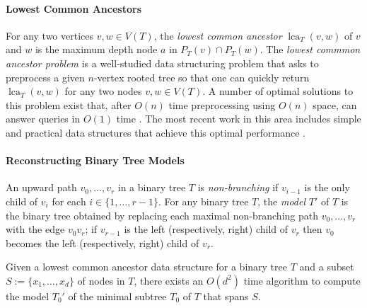 \documentclass{patmorin}
\DeclareMathOperator{\lca}{lca}
\begin{document}
\paragraph{Lowest Common Ancestors}

For any two vertices $v,w\in V(T)$, the \emph{lowest common ancestor} $\lca_T(v,w)$ of $v$ and $w$ is the maximum depth node $a$ in $P_T(v)\cap P_T(w)$.  The \emph{lowest commmon ancestor problem} is a well-studied data structuring problem that asks to preprocess a given $n$-vertex rooted tree so that one can quickly return $\lca_T(v,w)$ for any two nodes $v,w\in V(T)$. A number of optimal solutions to this problem exist that, after $O(n)$ time preprocessing using $O(n)$ space, can answer queries in $O(1)$ time \cite{berman.vishkin:recursive,shieber.vishkin:on,harel.tarjan:fast,alstrup.gavoille.ea:nearest,bender.farach-colton:lca,fischer.heun:theoretical}.  The most recent work in this area includes simple and practical data structures that achieve this optimal performance \cite{alstrup.gavoille.ea:nearest,bender.farach-colton:lca,fischer.heun:theoretical}.

\paragraph{Reconstructing Binary Tree Models}

An upward path $v_0,\ldots,v_r$ in a binary tree $T$ is \emph{non-branching} if $v_{i-1}$ is the only child of $v_i$ for each $i\in\{1,\ldots,r-1\}$.  For any binary tree $T$, the \emph{model} $T'$ of $T$ is the binary tree obtained by  replacing each maximal non-branching path $v_0,\ldots,v_r$ with the edge $v_0v_r$; if $v_{r-1}$ is the left (respectively, right) child of $v_r$ then $v_0$ becomes the left (respectively, right) child of $v_r$.

\begin{lem}\label{reconstruction}
  Given a lowest common ancestor data structure for a binary tree $T$ and a subset $S:=\{x_1,\ldots,x_d\}$ of nodes in $T$, there exists an $O(d^2)$ time algorithm to compute the model $T_0'$ of the minimal subtree $T_0$ of $T$ that spans $S$.
\end{lem}
\end{document}
